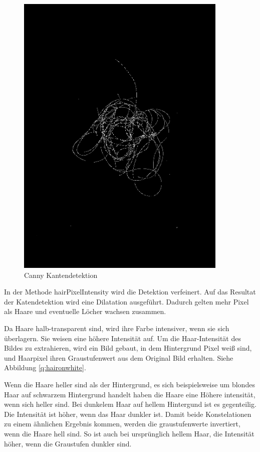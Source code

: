 \documentclass[german,a4paper,12pt]{llncs}
\begin{document}
\begin{figure}
	\centering
	\includegraphics[width=0.9\textwidth]{fig64/04edges.png}
	\caption[]{Canny Kantendetektion}
	\label{img:Edges}
\end{figure}

In der Methode hairPixelIntensity wird die Detektion verfeinert.
Auf das Resultat der Katendetektion wird eine Dilatation ausgeführt. Dadurch gelten mehr Pixel als Haare und eventuelle Löcher wachsen zusammen.

Da Haare halb-transparent sind, wird ihre Farbe intensiver, wenn sie sich überlagern. Sie weisen eine höhere Intensität auf.
Um die Haar-Intensität des Bildes zu extrahieren, wird ein Bild gebaut, in dem Hintergrund Pixel weiß sind, und Haarpixel ihren Graustufenwert aus dem Original Bild erhalten. Siehe Abbildung \ref{q:haironwhite}.

Wenn die Haare heller sind als der Hintergrund, es sich beispielsweise um blondes Haar auf schwarzem Hintergrund handelt haben die Haare eine Höhere intensität, wenn sich heller sind. Bei dunkelem Haar auf hellem Hintergund ist es gegenteilig. Die Intensität ist höher, wenn das Haar dunkler ist.
Damit beide Konstelationen zu einem ähnlichen Ergebnis kommen, werden die graustufenwerte invertiert, wenn die Haare hell sind. So ist auch bei ursprünglich hellem Haar, die Intensität höher, wenn die Graustufen dunkler sind.
\end{document}
